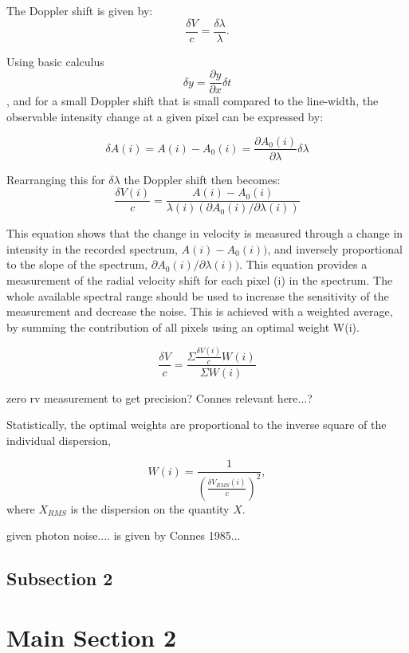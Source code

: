 The Doppler shift is given by:
\begin{equation}
\frac{\delta V}{c} = \frac{\delta \lambda}{\lambda}.
\label{eq:dopplershift}
\end{equation}

Using basic calculus \[\delta y = \frac{\partial y}{\partial x} \delta t  \nonumber\], and for a small Doppler shift that is small compared to the line-width, the observable intensity change at a given pixel can be expressed by:

\begin{equation}
\delta A(i) = A(i) - A_0(i) = \frac{\partial A_0(i)}{\partial \lambda} \delta \lambda 
\end{equation}

Rearranging this for \(\delta \lambda\) the Doppler shift then becomes:
\begin{equation}
    \frac{\delta V(i)}{c} = \frac{A(i) - A_0(i) }{\lambda(i) (\partial A_0(i)/\partial \lambda(i))}
\end{equation}

This equation shows that the change in velocity is measured through a change in intensity in the recorded spectrum, \(A(i)-A_0(i))\), and inversely proportional to the slope of the spectrum, \(\partial A_0(i)/\partial \lambda(i))\). 
This equation provides a measurement of the radial velocity shift for each pixel (i) in the spectrum. The whole available spectral range should be used to increase the sensitivity of the measurement and decrease the noise. This is achieved with a weighted average, by summing the contribution of all pixels using an optimal weight W(i).


\begin{equation}
\frac{\delta V}{c} = \frac{\Sigma{ \frac{\delta V(i)}{c}W(i)}}{\Sigma {W(i)}}
\end{equation}

 zero rv measurement to get precision? Connes relevant here...?

Statistically, the optimal weights are proportional to the inverse square of the individual dispersion,

\begin{equation}
W(i) = \frac{1}{\left(\frac{\delta V_{RMS}(i)}{c}\right)^2},
\end{equation}
where $X_{RMS}$ is the dispersion on the quantity $X$.


given photon noise.... is given by Connes 1985... 




\subsection{Subsection 2}


\section{Main Section 2}
